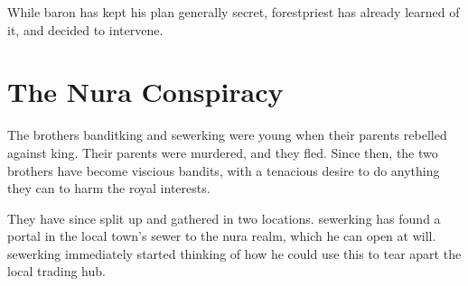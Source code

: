 While \gls{baron} has kept his plan generally secret, \gls{forestpriest} has already learned of it, and decided to intervene.

\section{The Nura Conspiracy}

The brothers \gls{banditking} and \gls{sewerking} were young when their parents rebelled against \gls{king}.
Their parents were murdered, and they fled.
Since then, the two brothers have become viscious bandits, with a tenacious desire to do anything they can to harm the royal interests.

They have since split up and gathered in two locations.
\Gls{sewerking} has found a portal in the local town's sewer to the nura realm, which he can open at will.
\Gls{sewerking} immediately started thinking of how he could use this to tear apart the local trading hub.

